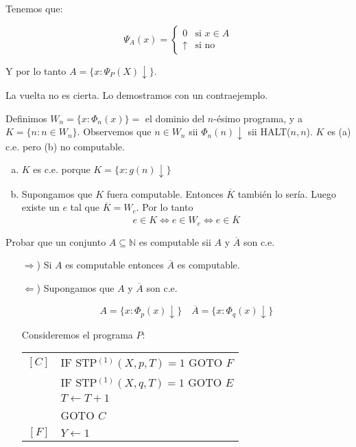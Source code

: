 \begin{questions}
\begin{solution}
 Tenemos que: 
 
  \begin{equation*}
    \Psi_A(x) = \left\{ \begin{matrix} 
      0 & \text{si } x\in A \\ 
      \uparrow & \text{si no}
    \end{matrix} \right.
  \end{equation*}

 Y por lo tanto $A = \{x : \Psi_P(X)\downarrow\}$. 
 
 La vuelta no es cierta. Lo demostramos con un contraejemplo. 
 
 Definimos $W_n=\{ x : \Phi_n(x)\} = $ el dominio del $n$-\'esimo programa, y a $K=\{n : n\in W_n\}$. Observemos que $n\in W_n$ sii $\Phi_n(n)\downarrow$ sii HALT($n,n$). $K$ es (a) c.e. pero (b) no computable. 
 
 \begin{enumerate}[(a)]
 \item $K$ es c.e. porque $K=\{x : g(n)\downarrow\}$
 \item Supongamos que $K$ fuera computable. Entonces $\overline{K}$ tambi\'en lo ser\'ia. Luego existe un $e$ tal que $\overline{K}=W_e$. Por lo tanto
 \begin{equation*}
  e \in K \Leftrightarrow e \in W_e \Leftrightarrow e\in \overline{K}
 \end{equation*}

 \end{enumerate}

\end{solution}

\question Probar que un conjunto $A\subseteq \mathbb{N}$ es computable sii $A$ y $\overline{A}$ son c.e.

\begin{solution}
\begin{itemize}
 \item[$\Rightarrow$)] Si $A$ es computable entonces $\overline{A}$ es computable. 
 
 \item[$\Leftarrow$)] Supongamos que $A$ y $\overline{A}$ son c.e.
 
 \begin{equation*}
  A = \{x : \Phi_p(x)\downarrow \} \quad \overline{A} = \{x : \Phi_q(x)\downarrow \}
 \end{equation*}
 
 Consideremos el programa $P$: 
 
  \vspace{0.5cm}
  \begin{tabular}{rl}
    $[C]$ & IF STP$^{(1)}(X,p,T) = 1$ GOTO $F$ \\
	  & IF STP$^{(1)}(X,q,T) = 1$ GOTO $E$ \\
	  & $T\leftarrow T+1$ \\
	  & GOTO $C$ \\
    $[F]$ & $Y\leftarrow 1$ \\
  \end{tabular}
  \vspace{0.5cm}


\end{itemize}
\end{solution}
\end{questions}
